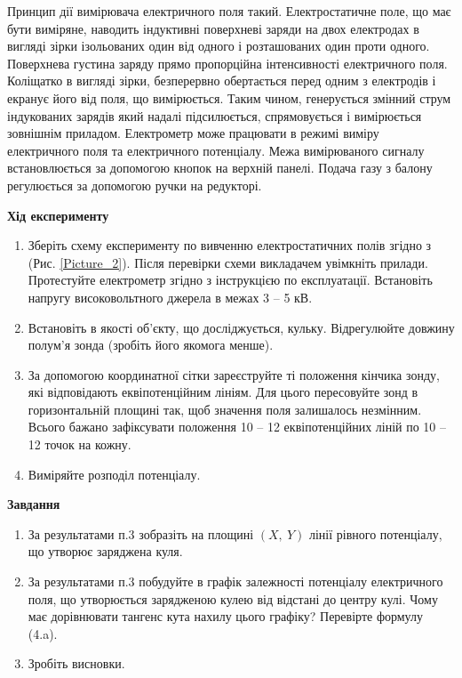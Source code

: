 \documentclass[a4paper,12pt]{article}
\begin{document}
	Принцип дії вимірювача електричного поля такий. Електростатичне поле, що має бути виміряне, наводить індуктивні поверхневі заряди на двох електродах в вигляді зірки ізольованих один від одного і розташованих один проти одного. Поверхнева густина заряду прямо пропорційна інтенсивності електричного поля. Коліщатко в вигляді зірки, безперервно обертається перед одним з електродів і екранує його від поля, що вимірюється. Таким чином, генерується змінний струм індукованих зарядів який надалі підсилюється, спрямовується і вимірюється зовнішнім приладом. Електрометр може працювати в режимі виміру електричного поля та електричного потенціалу. Межа вимірюваного сигналу встановлюється за допомогою кнопок на верхній панелі. Подача газу з балону регулюється за допомогою ручки на редукторі.
\newpage
	\begin{center}
		\textbf{Хід експерименту}
	\end{center}
	\begin{enumerate}
		\item  Зберіть схему експерименту по вивченню електростатичних полів згідно з (Рис. \ref{Picture_2}). Після перевірки схеми викладачем увімкніть прилади. Протестуйте електрометр 
		згідно з інструкцією по експлуатації. Встановіть напругу високовольтного джерела в межах 3 – 5 кВ.
		\item Встановіть в якості об’єкту, що досліджується, кульку. Відрегулюйте довжину полум’я зонда (зробіть його якомога менше).
		\item За допомогою координатної сітки зареєструйте ті положення кінчика зонду, які відповідають еквіпотенційним лініям. Для цього пересовуйте зонд в горизонтальній площині так, щоб значення поля залишалось незмінним. Всього бажано зафіксувати положення 10 – 12 еквіпотенційних ліній по 10 – 12 точок на кожну.
		\item Виміряйте розподіл потенціалу.
	\end{enumerate}
	\begin{center}
		\textbf{Завдання}
	\end{center}
	\begin{enumerate}
		\item  За результатами п.3 зобразіть на площині $(X,\:Y)$ лінії рівного потенціалу, що утворює заряджена куля.
		\item За результатами п.3 побудуйте в графік залежності потенціалу електричного поля, що утворюється зарядженою кулею від відстані до центру кулі. Чому має дорівнювати тангенс кута нахилу цього графіку? Перевірте формулу (4.a).
		\item Зробіть висновки.
	\end{enumerate}
	
\end{document}
